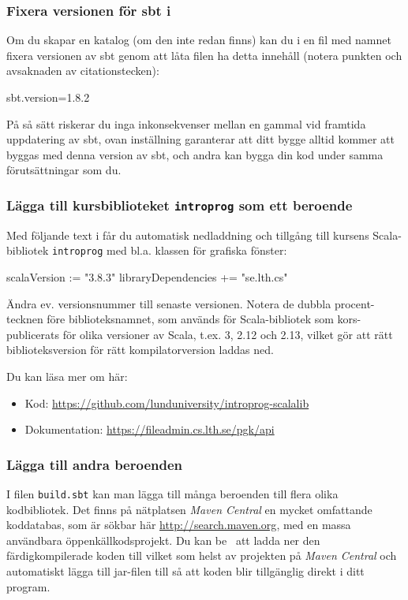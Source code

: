 \subsubsection{Fixera versionen för sbt i }
Om du skapar en katalog  (om den inte redan finns) kan du i en fil med namnet  fixera versionen av sbt genom att låta filen ha detta innehåll (notera punkten och avsaknaden av citationstecken):
\begin{Code}
sbt.version=1.8.2
\end{Code}
På så sätt riskerar du inga inkonsekvenser mellan en gammal  vid framtida uppdatering av sbt, ovan inställning garanterar att ditt bygge alltid kommer att byggas med denna version av sbt, och andra kan bygga din kod under samma förutsättningar som du.

\subsubsection{Lägga till kursbiblioteket \texttt{introprog} som ett beroende}

Med följande text i  får du automatisk nedladdning och tillgång till kursens Scala-bibliotek \texttt{introprog} med bl.a. klassen  för grafiska fönster:

\begin{Code}
scalaVersion := "3.8.3"
libraryDependencies += "se.lth.cs" %
\end{Code}
Ändra ev. versionsnummer till senaste versionen. Notera de dubbla procent-tecknen före biblioteksnamnet, som används för Scala-bibliotek som kors-publicerats för olika versioner av Scala, t.ex. 3, 2.12 och 2.13, vilket gör att rätt biblioteksversion för rätt kompilatorversion laddas ned.

Du kan läsa mer om  här: 
\begin{itemize}
  \item Kod: \url{https://github.com/lunduniversity/introprog-scalalib}
	\item Dokumentation: \url{https://fileadmin.cs.lth.se/pgk/api}
\end{itemize}


\subsubsection{Lägga till andra beroenden}

I filen \texttt{build.sbt} kan man lägga till många beroenden till flera olika kodbibliotek. Det finns på nätplatsen \textit{Maven Central} en mycket omfattande koddatabas, som är sökbar här \url{http://search.maven.org}, med en massa användbara öppenkällkodsprojekt. Du kan be \sbt\ att ladda ner den färdigkompilerade koden till vilket som helst av projekten på \textit{Maven Central} och automatiskt lägga till jar-filen till  så att koden blir tillgänglig direkt i ditt program.

